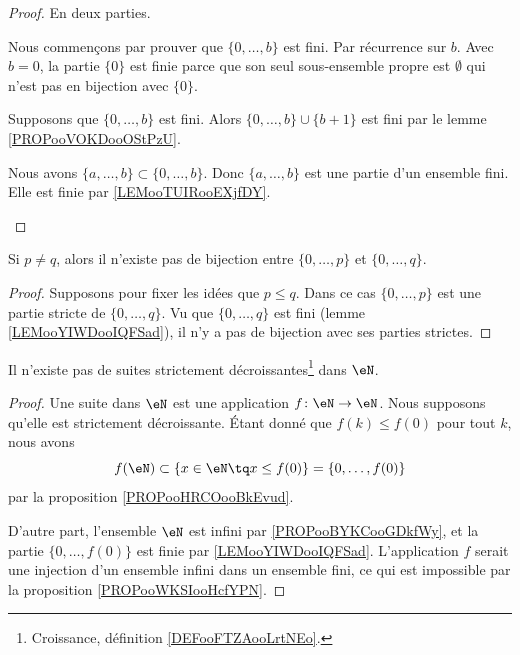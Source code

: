 \begin{proof}
	En deux parties.
	\begin{subproof}
		\spitem[Pour \( a=0\)]
		Nous commençons par prouver que \( \{ 0,\ldots,b \}\) est fini. Par récurrence sur \( b\). Avec \( b=0\), la partie \( \{ 0 \}\) est finie parce que son seul sous-ensemble propre est \( \emptyset\) qui n'est pas en bijection avec \( \{ 0 \}\).

		Supposons que \( \{ 0,\ldots, b \}\) est fini. Alors \( \{ 0,\ldots, b \}\cup \{ b+1 \}\) est fini par le lemme \ref{PROPooVOKDooOStPzU}.

		Nous avons \( \{ a,\ldots,b \}\subset\{ 0,\ldots,b \}\). Donc \( \{ a,\ldots,b \}\) est une partie d'un ensemble fini. Elle est finie par \ref{LEMooTUIRooEXjfDY}.
	\end{subproof}
\end{proof}

\begin{lemma}       \label{LEMooJDGOooHdyJnu}
	Si \( p\neq q\), alors il n'existe pas de bijection entre \( \{ 0,\ldots, p \}\) et \( \{ 0,\ldots, q \}\).
\end{lemma}

\begin{proof}
	Supposons pour fixer les idées que \( p\leq q\). Dans ce cas \( \{ 0,\ldots, p \}\) est une partie stricte de \( \{ 0,\ldots, q \}\). Vu que \( \{ 0,\ldots, q \}\) est fini (lemme \ref{LEMooYIWDooIQFSad}), il n'y a pas de bijection avec ses parties strictes.
\end{proof}

\begin{proposition}	\label{PROPooONYBooQuqAPR}
	Il n'existe pas de suites strictement décroissantes\footnote{Croissance, définition \ref{DEFooFTZAooLrtNEo}.} dans \( \eN\).
\end{proposition}

\begin{proof}
	Une suite dans \( \eN\) est une application \(f \colon \eN\to \eN  \). Nous supposons qu'elle est strictement décroissante. Étant donné que \( f(k)\leq f(0)\) pour tout \( k\), nous avons
	\begin{equation}
		f(\eN)\subset\{ x\in \eN\tq x\leq f(0) \}=\{ 0,\ldots,f(0) \}
	\end{equation}
	par la proposition \ref{PROPooHRCOooBkEvud}.

	D'autre part, l'ensemble \( \eN\) est infini par \ref{PROPooBYKCooGDkfWy}, et la partie \( \{ 0,\ldots,f(0) \}\) est finie par \ref{LEMooYIWDooIQFSad}. L'application \( f\) serait une injection d'un ensemble infini dans un ensemble fini, ce qui est impossible par la proposition \ref{PROPooWKSIooHcfYPN}.
\end{proof}


